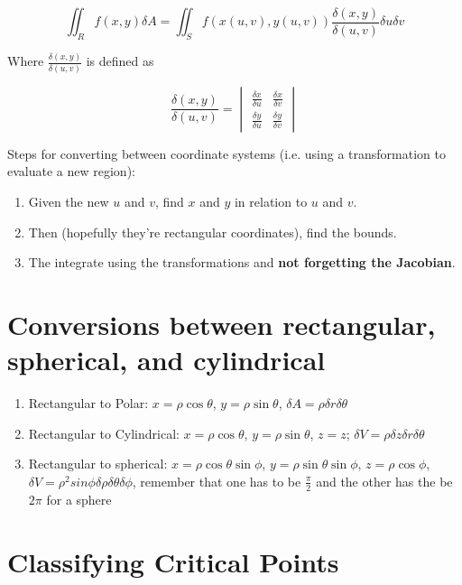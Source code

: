 \documentclass{article}
\begin{document}
$$\iint_R f(x, y) \delta A = \iint_S f(x(u, v), y(u, v)) \frac{\delta (x, y)}{\delta (u, v)} \delta u \delta v$$

Where $\frac{\delta (x, y)}{\delta (u, v)}$ is defined as

\[
    \frac{\delta (x, y)}{ \delta (u, v)} = \begin{vmatrix}
        \frac{\delta x}{\delta u} & \frac{\delta x}{\delta v}  \\
        \frac{\delta y}{\delta u} & \frac{\delta y}{ \delta v}
    \end{vmatrix}
\]

Steps for converting between coordinate systems (i.e. using a transformation to evaluate a new region):

\begin{enumerate}
    \item Given the new $u$ and $v$, find $x$ and $y$ in relation to $u$ and $v$.
    \item Then (hopefully they're rectangular coordinates), find the bounds.
    \item The integrate using the transformations and \textbf{not forgetting the Jacobian}.
\end{enumerate}


\section{Conversions between rectangular, spherical, and cylindrical}

\begin{enumerate}
    \item Rectangular to Polar: $x = \rho \cos \theta$, $y = \rho \sin \theta$, $\delta A = \rho \delta r \delta \theta$
    \item Rectangular to Cylindrical: $x = \rho \cos \theta$, $y = \rho \sin \theta$, $z = z$; $\delta V =  \rho \delta z \delta r \delta \theta$
    \item Rectangular to spherical: $x = \rho \cos \theta \sin \phi$, $y = \rho \sin \theta \sin \phi$, $z = \rho \cos \phi$, $\delta V = \rho^2 sin \phi \delta \rho \delta \theta \delta \phi$, remember that one has to be $\frac{\pi}{2}$ and the other has the be $2\pi$ for a sphere
\end{enumerate}

\section{Classifying Critical Points}
\end{document}
